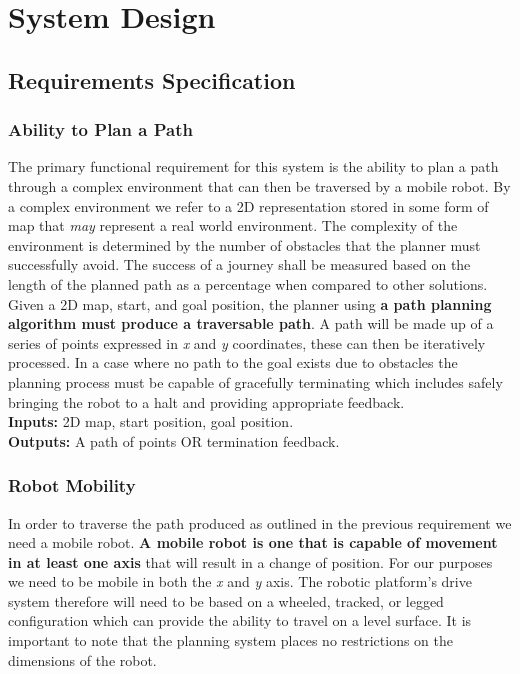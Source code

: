\chapter{System Design}


\section{Requirements Specification}

\subsection{Ability to Plan a Path}
\noindent
The primary functional requirement for this system is the ability to plan a path through a complex environment that can then be traversed by a mobile robot. By a complex environment we refer to a 2D representation stored in some form of map that \textit{may} represent a real world environment. The complexity of the environment is determined by the number of obstacles that the planner must successfully avoid. The success of a journey shall be measured based on the length of the planned path as a percentage when compared to other solutions. \\

\noindent
Given a 2D map, start, and goal position, the planner using \textbf{a path planning algorithm must produce a traversable path}. A path will be made up of a series of points expressed in \textit{x} and \textit{y} coordinates, these can then be iteratively processed. In a case where no path to the goal exists due to obstacles the planning process must be capable of gracefully terminating which includes safely bringing the robot to a halt and providing appropriate feedback. \\

\noindent
\textbf{Inputs:} 2D map, start position, goal position. \\
\textbf{Outputs:} A path of points OR termination feedback.

\newpage

\subsection{Robot Mobility}
\noindent
In order to traverse the path produced as outlined in the previous requirement we need a mobile robot. \textbf{A mobile robot is one that is capable of movement in at least one axis} that will result in a change of position. For our purposes we need to be mobile in both the \textit{x} and \textit{y} axis. The robotic platform's drive system therefore will need to be based on a wheeled, tracked, or legged configuration which can provide the ability to travel on a level surface. It is important to note that the planning system places no restrictions on the dimensions of the robot. \\ 

